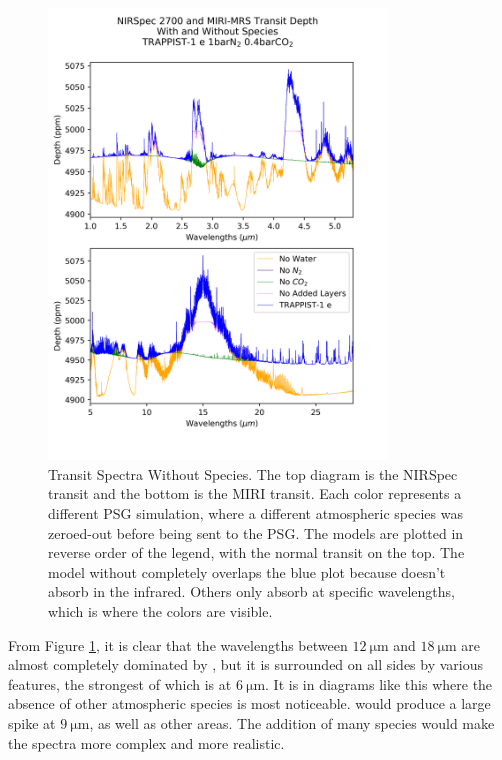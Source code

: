  \begin{figure}[ht]
    \begin{center}
        \includegraphics[width=0.8\textwidth]{spectra/nirmiri_without_species.png}
        \caption[Transit Spectra Without Species]{Transit
         Spectra Without Species. The top diagram is the NIRSpec transit and the
         bottom is the MIRI transit. Each color represents a different
         PSG simulation, where a different atmospheric species was zeroed-out
         before being sent to the PSG. The models are plotted in reverse order
         of the legend, with the normal transit on the top. The model without
          completely overlaps the blue plot because  doesn't
         absorb in
         the infrared. Others only absorb at specific wavelengths, which is
         where the colors are visible.}
        \label{nospecies}
    \end{center}
\end{figure}

From Figure \ref{nospecies}, it is clear that the wavelengths between
 $\SI{12}{\micro\meter}$ and $\SI{18}{\micro\meter}$ are almost completely
 dominated by , but it is
 surrounded on all sides by various  features, the strongest of
 which is at $\SI{6}{\micro\meter}$. It is in diagrams like this where the
 absence of other
 atmospheric species is most noticeable.  would produce a large
 spike at $\SI{9}{\micro\meter}$, as well as other areas. The addition of many
 species would
 make the spectra more complex and more realistic.

